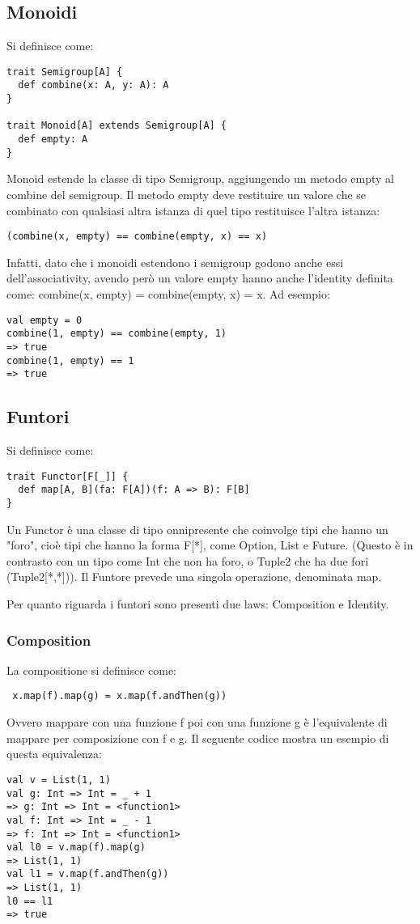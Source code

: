 \subsection{Monoidi}
Si definisce come:
\begin{verbatim}
trait Semigroup[A] {
  def combine(x: A, y: A): A
}

trait Monoid[A] extends Semigroup[A] {
  def empty: A
}
\end{verbatim}

\noindent Monoid estende la classe di tipo Semigroup, aggiungendo un metodo empty al combine del semigroup. Il metodo empty deve restituire un valore che se combinato con qualsiasi altra istanza di quel tipo restituisce l'altra istanza: 
\begin{verbatim}
(combine(x, empty) == combine(empty, x) == x)
\end{verbatim}
\noindent Infatti, dato che i monoidi estendono i semigroup godono anche essi dell’associativity, avendo però un valore empty hanno anche l’identity definita come: combine(x, empty) = combine(empty, x) = x.
Ad esempio:
\begin{verbatim}
val empty = 0
combine(1, empty) == combine(empty, 1)
=> true
combine(1, empty) == 1
=> true
\end{verbatim}

\subsection{Funtori}
Si definisce come: 
\begin{verbatim}
trait Functor[F[_]] {
  def map[A, B](fa: F[A])(f: A => B): F[B]
}
\end{verbatim}
\noindent Un Functor è una classe di tipo onnipresente che coinvolge tipi che hanno un "foro", cioè tipi che hanno la forma F[*], come Option, List e Future. (Questo è in contrasto con un tipo come Int che non ha foro, o Tuple2 che ha due fori (Tuple2[*,*])). Il Funtore prevede una singola operazione, denominata map.

\noindent Per quanto riguarda i funtori sono presenti due laws: Composition e Identity.
\subsubsection{Composition}
La compositione si definisce come:
\begin{verbatim}
 x.map(f).map(g) = x.map(f.andThen(g))
 \end{verbatim}
\noindent Ovvero mappare con una funzione f poi con una funzione g è l'equivalente di mappare per composizione
con f e g. Il seguente codice mostra un esempio di questa equivalenza:
\begin{verbatim}
val v = List(1, 1)
val g: Int => Int = _ + 1
=> g: Int => Int = <function1>
val f: Int => Int = _ - 1
=> f: Int => Int = <function1>
val l0 = v.map(f).map(g)
=> List(1, 1)
val l1 = v.map(f.andThen(g))
=> List(1, 1)
l0 == l1
=> true
 \end{verbatim}

